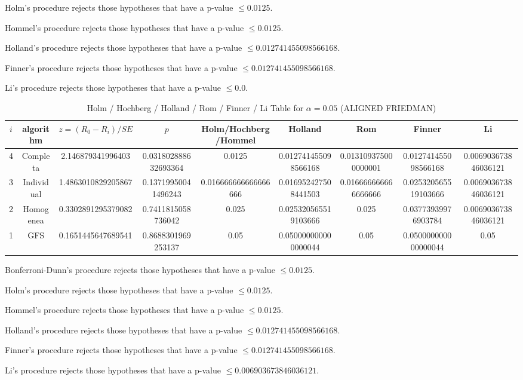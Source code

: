\documentclass[a4paper,10pt]{article}
\begin{document}
\begin{landscape}
Holm's procedure rejects those hypotheses that have a p-value $\le0.0125$.


Hommel's procedure rejects those hypotheses that have a p-value $\le0.0125$.


Holland's procedure rejects those hypotheses that have a p-value $\le0.012741455098566168$.


Finner's procedure rejects those hypotheses that have a p-value $\le0.012741455098566168$.


Li's procedure rejects those hypotheses that have a p-value $\le0.0$.



\newpage

\begin{table}[!htp]
\centering\scriptsize
\caption{Holm / Hochberg / Holland / Rom / Finner / Li Table for $\alpha=0.05$ (ALIGNED FRIEDMAN)}
\begin{tabular}{ccccccccc}
$i$&algorithm&$z=(R_0 - R_i)/SE$&$p$&Holm/Hochberg/Hommel&Holland&Rom&Finner&Li\\
\hline
4&Completa&2.146879341996403&0.031802888632693364&0.0125&0.012741455098566168&0.013109375000000001&0.012741455098566168&0.006903673846036121\\
3&Individual&1.4863010829205867&0.13719950041496243&0.016666666666666666&0.016952427508441503&0.016666666666666666&0.025320565519103666&0.006903673846036121\\
2&Homogenea&0.3302891295379082&0.7411815058736042&0.025&0.025320565519103666&0.025&0.03773939976903784&0.006903673846036121\\
1&GFS&0.1651445647689541&0.8688301969253137&0.05&0.050000000000000044&0.05&0.050000000000000044&0.05\\
\hline
\end{tabular}
\end{table}
Bonferroni-Dunn's procedure rejects those hypotheses that have a p-value $\le0.0125$.


Holm's procedure rejects those hypotheses that have a p-value $\le0.0125$.


Hommel's procedure rejects those hypotheses that have a p-value $\le0.0125$.


Holland's procedure rejects those hypotheses that have a p-value $\le0.012741455098566168$.


Finner's procedure rejects those hypotheses that have a p-value $\le0.012741455098566168$.


Li's procedure rejects those hypotheses that have a p-value $\le0.006903673846036121$.




\end{landscape}
\end{document}
